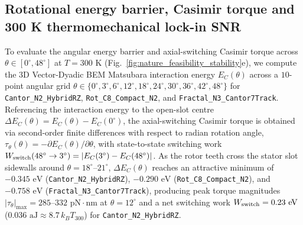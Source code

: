 \documentclass[pdflatex,sn-nature]{sn-jnl}
\begin{document}
\subsection*{Rotational energy barrier, Casimir torque and 300 K thermomechanical lock-in SNR}
To evaluate the angular energy barrier and axial-switching Casimir torque across $\theta \in [0^\circ, 48^\circ]$ at $T = 300\text{ K}$ (Fig.~\ref{fig:nature_feasibility_stability}e), we compute the 3D Vector-Dyadic BEM Matsubara interaction energy $E_C(\theta)$ across a $10$-point angular grid $\theta \in \{0^\circ, 3^\circ, 6^\circ, 12^\circ, 18^\circ, 24^\circ, 30^\circ, 36^\circ, 42^\circ, 48^\circ\}$ for \texttt{Cantor\_N2\_HybridRZ}, \texttt{Rot\_C8\_Compact\_N2}, and \texttt{Fractal\_N3\_Cantor7Track}. Referencing the interaction energy to the open-slot centre $\Delta E_C(\theta) = E_C(\theta) - E_C(0^\circ)$, the axial-switching Casimir torque is obtained via second-order finite differences with respect to radian rotation angle, $\tau_\theta(\theta) = -\partial E_C(\theta)/\partial\theta$, with state-to-state switching work $W_{\rm switch}(48^\circ \to 3^\circ) = |E_C(3^\circ) - E_C(48^\circ)|$. As the rotor teeth cross the stator slot sidewalls around $\theta = 18^\circ\text{--}21^\circ$, $\Delta E_C(\theta)$ reaches an attractive minimum of $-0.345\text{ eV}$ (\texttt{Cantor\_N2\_HybridRZ}), $-0.290\text{ eV}$ (\texttt{Rot\_C8\_Compact\_N2}), and $-0.758\text{ eV}$ (\texttt{Fractal\_N3\_Cantor7Track}), producing peak torque magnitudes $|\tau_\theta|_{\max} = 285\text{--}332\text{ pN}\cdot\text{nm}$ at $\theta = 12^\circ$ and a net switching work $W_{\rm switch} = 0.23\text{ eV}$ ($0.036\text{ aJ} \approx 8.7\,k_B T_{300}$) for \texttt{Cantor\_N2\_HybridRZ}.
\end{document}
